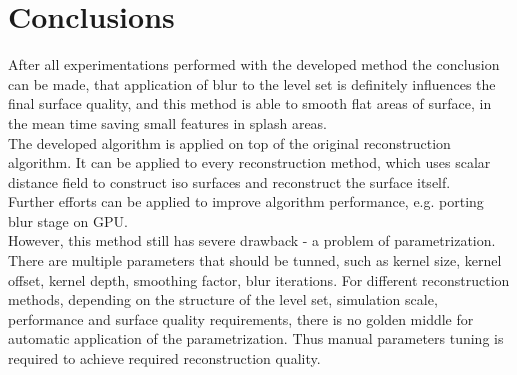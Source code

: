 \section{Conclusions}
After all experimentations performed with the developed method the conclusion can be made, that application of blur to the level set is definitely influences the final surface quality, and this method is able to smooth flat areas of surface, in the mean time saving small features in splash areas.\\
The developed algorithm is applied on top of the original reconstruction algorithm. It can be applied to every reconstruction method, which uses scalar distance field to construct iso surfaces and reconstruct the surface itself.\\ 
Further efforts can be applied to improve algorithm performance, e.g. porting blur stage on GPU.\\
However, this method still has severe drawback - a problem of parametrization. There are multiple parameters that should be tunned, such as kernel size, kernel offset, kernel depth, smoothing factor, blur iterations. For different reconstruction methods, depending on the structure of the level set, simulation scale, performance and surface quality requirements, there is no golden middle for automatic application of the parametrization. Thus manual parameters tuning is required to achieve required reconstruction quality.\\

